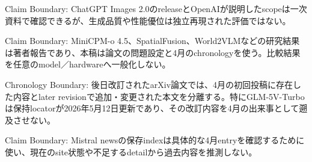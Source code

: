\begin{claimboundary}
Claim Boundary: ChatGPT Images 2.0のreleaseとOpenAIが説明したscopeは一次資料で確認できるが、生成品質や性能優位は独立再現された評価ではない。\autocite{src-0f697d747d9c}
\end{claimboundary}

\begin{claimboundary}
Claim Boundary: MiniCPM-o 4.5、SpatialFusion、World2VLMなどの研究結果は著者報告であり、本稿は論文の問題設定と4月のchronologyを使う。比較結果を任意のmodel／hardwareへ一般化しない。\autocite{src-3fa7f7c1140f,src-d33ba68aac3c,src-fec81b98fdc8}
\end{claimboundary}

\begin{claimboundary}
Chronology Boundary: 後日改訂されたarXiv論文では、4月の初回投稿に存在した内容とlater revisionで追加・変更された本文を分離する。特にGLM-5V-Turboは保持locatorが2026年5月12日更新であり、その改訂内容を4月の出来事として遡及させない。\autocite{src-d113b486a585}
\end{claimboundary}

\begin{claimboundary}
Claim Boundary: Mistral newsの保存indexは具体的な4月entryを確認するために使い、現在のsite状態や不足するdetailから過去内容を推測しない。\autocite{src-d8b7c1c36830}
\end{claimboundary}
